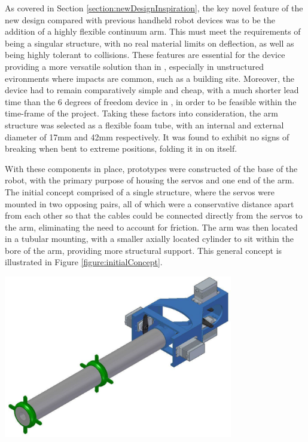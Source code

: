 \documentclass[11pt]{article}
\begin{document}
As covered in Section \ref{section:newDesignInspiration}, the key novel feature of the new design compared with previous handheld robot devices was to be the addition of a highly flexible continuum arm. This must meet the requirements of being a singular structure, with no real material limits on deflection, as well as being highly tolerant to collisions. These features are essential for the device providing a more versatile solution than in \cite{GreggSmithDesign}, especially in unstructured evironments where impacts are common, such as a building site. Moreover, the device had to remain comparatively simple and cheap, with a much shorter lead time than the 6 degrees of freedom device in \cite{GreggSmithKinematics}, in order to be feasible within the time-frame of the project. Taking these factors into consideration, the arm structure was selected as a flexible foam tube, with an internal and external diameter of 17mm and 42mm respectively. It was found to exhibit no signs of breaking when bent to extreme positions, folding it in on itself.

With these components in place, prototypes were constructed of the base of the robot, with the primary purpose of housing the servos and one end of the arm. The initial concept comprised of a single structure, where the servos were mounted in two opposing pairs, all of which were a conservative distance apart from each other so that the cables could be connected directly from the servos to the arm, eliminating the need to account for friction. The arm was then located in a tubular mounting, with a smaller axially located cylinder to sit within the bore of the arm, providing more structural support. This general concept is illustrated in Figure \ref{figure:initialConcept}.

\begin{center}
\includegraphics[width=0.75\textwidth]{images/initialConcept.png}
\label{figure:initialConcept}
\end{center}
\end{document}
